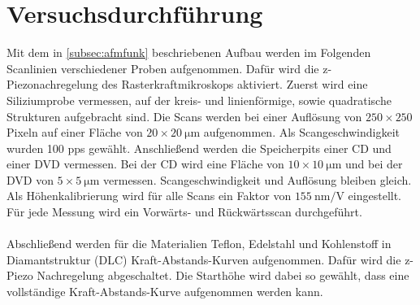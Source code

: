 \section{Versuchsdurchführung}
Mit dem in \autoref{subsec:afmfunk} beschriebenen Aufbau werden im Folgenden Scanlinien verschiedener Proben aufgenommen. Dafür wird die z-Piezonachregelung des Rasterkraftmikroskops aktiviert. Zuerst wird eine Siliziumprobe vermessen, auf der kreis- und linienförmige, sowie quadratische Strukturen aufgebracht sind. Die Scans werden bei einer Auflösung von $250 \times 250$ Pixeln auf einer Fläche von $20\times\SI{20}{\micro\meter}$ aufgenommen. Als Scangeschwindigkeit wurden 100 pps gewählt.
Anschließend werden die Speicherpits einer CD und einer DVD vermessen. Bei der CD wird eine Fläche von $10\times\SI{10}{\micro\meter}$ und bei der DVD von $5\times\SI{5}{\micro\meter}$ vermessen. Scangeschwindigkeit und Auflösung bleiben gleich. Als Höhenkalibrierung wird für alle Scans ein Faktor von $\SI{155}{\nano\meter\per\volt}$ eingestellt. Für jede Messung wird ein Vorwärts- und Rückwärtsscan durchgeführt.\\
\\
Abschließend werden für die Materialien Teflon, Edelstahl und Kohlenstoff in Diamantstruktur (DLC) Kraft-Abstands-Kurven aufgenommen. Dafür wird die z-Piezo Nachregelung abgeschaltet. Die Starthöhe wird dabei so gewählt, dass eine vollständige Kraft-Abstands-Kurve aufgenommen werden kann.
